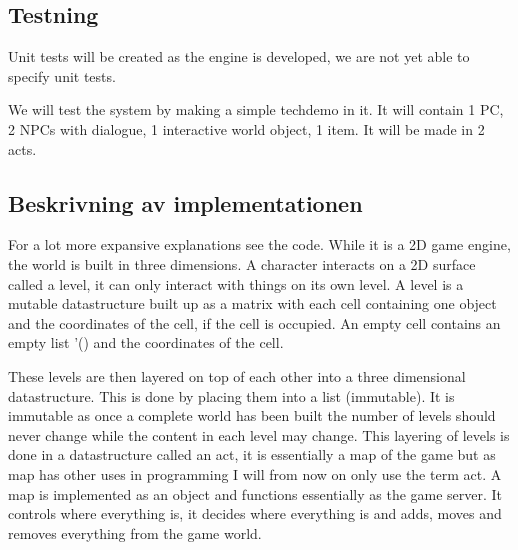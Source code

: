 \documentclass[12pt,a4paper]{article}
\begin{document}

\subsection{Testning}

Unit tests will be created as the engine is developed, we are not yet able to specify unit tests.

We will test the system by making a simple techdemo in it. It will contain 1 PC, 2 NPCs with dialogue, 1 interactive world object, 1 item. It will be made in 2 acts.

\subsection{Beskrivning av implementationen}

For a lot more expansive explanations see the code.
While it is a 2D game engine, the world is built in three dimensions.
A character interacts on a 2D surface called a level, it can only interact with things on its own level.
A level is a mutable datastructure built up as a matrix with each cell containing one object and the coordinates of the cell, if the cell is occupied. An empty cell contains an empty list '() and the coordinates of the cell. 

These levels are then layered on top of each other into a three dimensional datastructure. This is done by placing them into a list (immutable). It is immutable as once a complete world has been built the number of levels should never change while the content in each level may change.
This layering of levels is done in a datastructure called an act, it is essentially a map of the game but as map has other uses in programming I will from now on only use the term act. A map is implemented as an object and functions essentially as the game server. It controls where everything is, it decides where everything is and adds, moves and removes everything from the game world.
\end{document}
